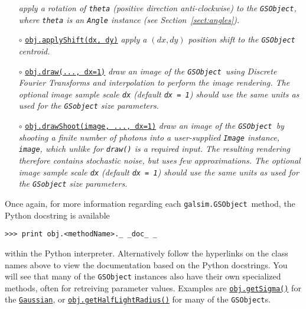 \documentclass[preprint,11pt]{aastex}
\begin{document}
\begin{itemize}
  \newline \emph{apply a rotation of \texttt{theta} (positive direction
  anti-clockwise) to the \texttt{GSObject}, where \texttt{theta} is an
  \texttt{Angle} instance (see Section~\ref{sect:angles}).}
\item[$\circ$]
  \href{http://galsim-developers.github.com/GalSim/classgalsim_1_1base_1_1_g_s_object.html#a6b547741eeec4086de9abe227dae9325}{\texttt{obj.applyShift(dx,
      dy)}} \newline \emph{apply a $(dx, dy)$ position shift to the
    \texttt{GSObject} centroid.}
\item[$\circ$]
  \href{http://galsim-developers.github.com/GalSim/classgalsim_1_1base_1_1_g_s_object.html#ae0b346a8b438dedbc7f60a52220869d8}{\texttt{obj.draw(...,
      dx=1)}}
  \newline \emph{draw an image of the \texttt{GSObject}~using Discrete Fourier
  Transforms and interpolation to perform the image rendering.  The
  optional image sample scale \texttt{dx} (default \texttt{dx~=~1})
  should use the same units as used for the \texttt{GSobject} size parameters.}
\item[$\circ$]
  \href{http://galsim-developers.github.com/GalSim/classgalsim_1_1base_1_1_g_s_object.html#a42ac334d2840ba3fa832988e998beca0}{\texttt{obj.drawShoot(image,
      ..., dx=1)}}
  \newline \emph{draw an image of the \texttt{GSObject}~by shooting a finite number of
  photons into a user-supplied \texttt{Image} instance,
  \texttt{image}, which unlike for \texttt{draw()} is a required input.  The resulting rendering
  therefore contains stochastic noise, but uses few approximations. The
  optional image sample scale \texttt{dx} (default \texttt{dx~=~1})
  should use the same units as used for the \texttt{GSobject} size parameters.}
\end{itemize}
Once again, for more information regarding each \texttt{galsim.GSObject}~method,
the Python docstring is available

{\tt >>> print obj.<methodName>.\_\,\_doc\_\,\_}

within the Python interpreter.  Alternatively follow the hyperlinks on
the class names above to view the documentation based
on the Python docstrings.  You will see that many of the \texttt{GSObject}
instances also have their own specialized methods, often for
retreiving parameter values. Examples are
\href{http://galsim-developers.github.com/GalSim/classgalsim_1_1base_1_1_gaussian.html#a418f2826a7b8934cfedc181de23ce826}{\texttt{obj.getSigma()}}
for the
\href{http://galsim-developers.github.com/GalSim/classgalsim_1_1base_1_1_gaussian.html}{\texttt{Gaussian}},
or
\href{http://galsim-developers.github.com/GalSim/classgalsim_1_1base_1_1_sersic.html#ad6ca39293c6b478fc052d07ea51d086f}{\texttt{obj.getHalfLightRadius()}}
for many of the \texttt{GSObject}s.
\end{document}
